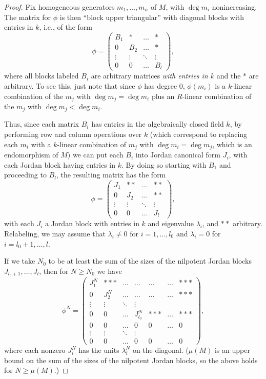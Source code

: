 \documentclass[12pt]{article}
\let\l\lambda
\theoremstyle{theorem}
\numberwithin{thm}{section}
\theoremstyle{definition}
\begin{document}
\begin{proof}
Fix homogeneous generators $m_1,\dots,m_n$ of $M$, with $\deg m_i$ nonincreasing.
The matrix for $\phi$ is then ``block upper triangular'' with diagonal blocks with entries in $k$, i.e., of the form
$$
\phi=
\begin{pmatrix}
  B_1 & * & \dots& * \\
  0 & B_2 & \dots &* \\
\vdots &\vdots & \ddots &\vdots \\
0 & 0 & \dots &B_l
\end{pmatrix},
$$
where all blocks labeled $B_i$ are arbitrary matrices \emph{with entries in $k$} and the $*$ are arbitrary.
To see this, just note that since $\phi$ has degree 0, $\phi(m_i)$ is a $k$-linear combination of the $m_j$ with $\deg m_j=\deg m_i$ plus an $R$-linear combination of the $m_j$ with $\deg m_j<\deg m_i$.

Thus, since each matrix $B_i$ has entries in the algebraically closed field $k$, by performing row and column operations over $k$ (which correspond to replacing each $m_i$ with a $k$-linear combination of $m_j$ with $\deg m_i = \deg m_j$, which is an endomorphism of $M$) we can put each $B_i$ into Jordan canonical form $J_i$, with each Jordan block having entries in $k$. By doing so starting with $B_1$ and proceeding to $B_l$, the resulting matrix has the form
\begin{equation}
\label{eq:Jordan}
\phi
=
\begin{pmatrix}
  J_1 & ** & \dots& ** \\
  0 & J_2 & \dots &** \\
\vdots &\vdots & \ddots &\vdots \\
0 & 0 & \dots & J_l
\end{pmatrix},
\end{equation}
with each $J_i$ a Jordan block with entries in $k$ and eigenvalue $\l_i$, and $**$ arbitrary.
Relabeling, we may assume that $\l_i\neq 0$ for $i=1,\dots,l_0$ and $\l_i=0$ for $i=l_0+1,\dots,l$.

If we take $N_0  $ to be at least the sum of the sizes of the nilpotent Jordan blocks $J_{l_0+1},\dots,J_l$, then for $N\geq N_0$ we have
$$
\phi^N = 
\begin{pmatrix}
  J_1^N & *** &\dots & \dots& \dots  &\dots & *** \\
  0 & J_2^N & \dots &\dots&\dots & \dots& *** \\
\vdots &\vdots & \ddots &\vdots \\
0 & 0 & \dots & J_{l_0}^N & *** & \dots & ***\\
0 & 0 & \dots & 0 & 0 & \dots & 0\\
\vdots &\vdots & \ddots &\vdots \\
0 & 0 & \dots & 0 & 0 & \dots & 0
\end{pmatrix},
$$
where each nonzero $J_i^N$ has the units $\l_i^N$ on the diagonal. 
($\mu(M)$ is an upper bound on the sum of the sizes of the nilpotent Jordan blocks, so the above holds for $N\geq \mu(M)$.)


\end{proof}
\end{document}

